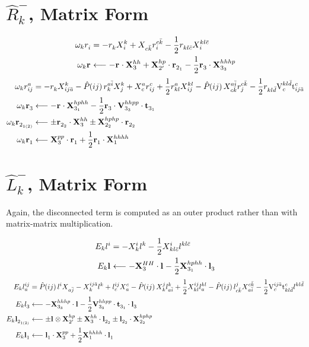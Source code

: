 \documentclass[thesis.tex]{subfiles}
\begin{document}
\section{$\hat{R}^{-}_{k}$, Matrix Form}

\begin{align}
  \omega_{k}r^{}_{i} &= -r^{}_{k}X^{k}_{\hspace{0.3pt} i} + X^{}_{\hspace{0.3pt} c\bar{k}}r^{c\bar{k}}_{i} - \frac{1}{2}r^{}_{kl\bar{c}}X^{kl\bar{c}}_{\hspace{0.3pt} i} \notag \\
  \omega_{k}\mathbf{r}^{}_{} &\longleftarrow -\mathbf{r}^{}_{}\cdot\mathbf{X}^{hh}_{\hspace{0.3pt} 3} + \mathbf{X}^{hp}_{\hspace{0.3pt} 2'}\cdot\mathbf{r}^{}_{2_{1}} - \frac{1}{2}\mathbf{r}^{}_{3}\cdot\mathbf{X}^{hhhp}_{\hspace{0.3pt} 3_{3}}
\end{align}
\begin{align}
  \omega_{k}r^{a}_{ij} &= -r^{}_{k}X^{k}_{\hspace{0.3pt} ij\bar{a}} - \mathop{\hat{P}\hspace{-2pt}\left( ij\right) }r^{a\bar{i}}_{k}X^{k}_{\hspace{0.3pt} j} + X^{a}_{\hspace{0.3pt} c}r^{c}_{ij} + \frac{1}{2}r^{a}_{kl}X^{kl}_{\hspace{0.3pt} ij} - \mathop{\hat{P}\hspace{-2pt}\left( ij\right) }X^{a\bar{i}}_{\hspace{0.3pt} c\bar{k}}r^{c\bar{k}}_{j} - \frac{1}{2}r^{}_{kl\bar{d}}\text{V}^{kl\bar{d}}_{c}\text{t}^{c}_{ij\bar{a}} \notag \\
  \omega_{k}\mathbf{r}^{}_{3} &\longleftarrow -\mathbf{r}^{}_{}\cdot\mathbf{X}^{hphh}_{\hspace{0.3pt} 3_{1}} - \frac{1}{2}\mathbf{r}^{}_{3}\cdot\text{\textbf{V}}^{hhpp}_{3_{3}}\cdot\mathbf{t}^{}_{3_{1}} \notag \\
  \omega_{k}\mathbf{r}^{}_{2_{1(2)}} &\longleftarrow \pm\mathbf{r}^{}_{2_{2}}\cdot\mathbf{X}^{hh}_{\hspace{0.3pt} 3} \pm\mathbf{X}^{hphp}_{\hspace{0.3pt} 2_{2}}\cdot\mathbf{r}^{}_{2_{2}} \notag \\
  \omega_{k}\mathbf{r}^{}_{1} &\longleftarrow \mathbf{X}^{pp}_{\hspace{0.3pt} 3}\cdot\mathbf{r}^{}_{1} + \frac{1}{2}\mathbf{r}^{}_{1}\cdot\mathbf{X}^{hhhh}_{\hspace{0.3pt} 1}
\end{align}


\section{$\hat{L}^{-}_{k}$, Matrix Form}
Again, the disconnected term is computed as an outer product rather than with matrix-matrix multiplication.

\begin{align}
  E_{k}l^{i}_{} &= -X^{i}_{\hspace{0.3pt} k}l^{k}_{} - \frac{1}{2}X^{i}_{\hspace{0.3pt} kl\bar{c}}l^{kl\bar{c}}_{} \notag \\
  E_{k}\mathbf{l}^{}_{} &\longleftarrow -\mathbf{X}^{HH}_{\hspace{0.3pt} 3}\cdot\mathbf{l}^{}_{} - \frac{1}{2}\mathbf{X}^{hphh}_{\hspace{0.3pt} 3_{1}}\cdot\mathbf{l}^{}_{3}
\end{align}
\begin{align}
  E_{k}l^{ij}_{a} &= \mathop{\hat{P}\hspace{-2pt}\left( ij\right) }l^{i}_{}X^{}_{\hspace{0.3pt} a\bar{j}} - X^{ij\bar{a}}_{\hspace{0.3pt} k}l^{k}_{} + l^{ij}_{c}X^{c}_{\hspace{0.3pt} a} - \mathop{\hat{P}\hspace{-2pt}\left( ij\right) }X^{j}_{\hspace{0.3pt} k}l^{k}_{a\bar{i}} + \frac{1}{2}X^{ij}_{\hspace{0.3pt} kl}l^{kl}_{a} - \mathop{\hat{P}\hspace{-2pt}\left( ij\right) }l^{j}_{c\bar{k}}X^{c\bar{k}}_{\hspace{0.3pt} a\bar{i}} - \frac{1}{2}\text{V}^{ij\bar{a}}_{c}\text{t}^{c}_{kl\bar{d}}l^{kl\bar{d}}_{} \notag \\
  E_{k}l^{}_{3} &\longleftarrow -\mathbf{X}^{hhhp}_{\hspace{0.3pt} 3_{3}}\cdot\mathbf{l}^{}_{} - \frac{1}{2}\text{\textbf{V}}^{hhpp}_{3_{3}}\cdot\mathbf{t}^{}_{3_{1}}\cdot\mathbf{l}^{}_{3} \notag \\
  E_{k}\mathbf{l}^{}_{2_{1(2)}} &\longleftarrow \pm\mathbf{l}^{}_{}\otimes\mathbf{X}^{hp}_{\hspace{0.3pt} 2'} \pm\mathbf{X}^{hh}_{\hspace{0.3pt} 3}\cdot\mathbf{l}^{}_{2_{2}} \pm\mathbf{l}^{}_{2_{2}}\cdot\mathbf{X}^{hphp}_{\hspace{0.3pt} 2_{2}} \notag \\
  E_{k}\mathbf{l}^{}_{1} &\longleftarrow \mathbf{l}^{}_{1}\cdot\mathbf{X}^{pp}_{\hspace{0.3pt} 3} + \frac{1}{2}\mathbf{X}^{hhhh}_{\hspace{0.3pt} 1}\cdot\mathbf{l}^{}_{1}
\end{align}
\end{document}
